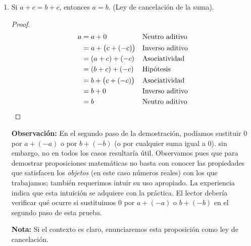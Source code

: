 \documentclass[11pt]{article}
\newcommand{\bfit}[1]{\textbf{\textit{#1}}}
\begin{document}
\begin{enumerate}[label=\alph*)]
 \textbf{Nota:} En esta demostración, al emplear la \textit{forma} de la unicidad del inverso aditivo, $x+y=0 \Longrightarrow y=-x$, hemos tomado $x=(a+b)$ y $y=(-a)+ (-b)$.

 \bfit{Corolario:} $-\bigl(a+(-b)\bigr)=b+(-a)$. \begin{proof} 
  \begin{align*}
  -\bigl(a+(-b)\bigr)&= (-a) + \bigl(-(-b)\bigr) &&\text{Distribución del signo} \\
  &= (-a) + b &&\text{Inverso aditivo del inverso aditivo} \\
  &= b +(-a) &&\text{Conmutatividad} \qedhere
  \end{align*} 
 \end{proof}

  \textbf{Nota:} En esta demostración, al emplear la \textit{forma} de la distribución del signo, $-(x+y)=(-x)+(-y)$, hemos tomado $x=a$ y $y=(-b)$.

 \item Si $a+c=b+c$, entonces $a=b$. (Ley de cancelación de la suma).
 \begin{proof} 
 \begin{align*}
  a &= a+0 && \text{Neutro aditivo}\\
  &= a+ \bigl(c+(-c)\bigr) && \text{Inverso aditivo}\\
  &= (a+c) + (-c) && \text{Asociatividad}\\
  &= (b+c) + (-c) && \text{Hipótesis}\\
  &= b + \bigl(c+(-c)\bigr) && \text{Asociatividad}\\
  &= b + 0 && \text{Inverso aditivo}\\
  &= b &&\text{Neutro aditivo} \qedhere
 \end{align*} 
\end{proof}

\textbf{Observación:} En el segundo paso de la demostración, podíamos sustituir $0$ por $a+(-a)$ o por $b+(-b)$ (o por cualquier suma igual a $0$). sin embargo, no en todos los casos resultaría útil. Observamos pues que para demostrar proposiciones matemáticas no basta con conocer las propiedades que satisfacen los \textit{objetos} (en este caso números reales) con los que trabajamos; también requerimos intuir su uso apropiado. La experiencia indica que esta intuición se adquiere con la práctica. El lector debería verificar qué ocurre si sustituimos $0$ por $a+(-a)$ o $b+(-b)$ en el segundo paso de esta prueba.

\textbf{Nota:} Si el contexto es claro, enunciaremos esta proposición como ley de cancelación.
\end{enumerate}
\end{document}
